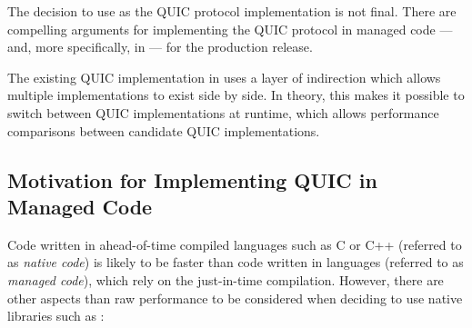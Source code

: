 The decision to use \libmsquic{} as the QUIC protocol implementation is not final. There are
compelling arguments for implementing the QUIC protocol in managed \dotnet{} code --- and, more
specifically, in \csharp{} --- for the production release.

The existing QUIC implementation in \dotnet{} uses a layer of indirection which allows multiple
implementations to exist side by side. In theory, this makes it possible to switch between QUIC
implementations at runtime, which allows performance comparisons between candidate QUIC
implementations.

\subsection*{Motivation for Implementing QUIC in Managed Code}

Code written in ahead-of-time compiled languages such as C or C++ (referred to as \textit{native
code}) is likely to be faster than code written in \dotnet{} languages (referred to as
\textit{managed code}), which rely on the just-in-time compilation. However, there are other aspects
than raw performance to be considered when deciding to use native libraries such as \libmsquic{}:

